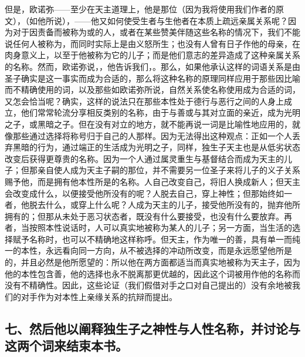 但是，欧诺弥——至少在天主道理上，他是那位（因为我将使用我们作者的原文），（如他所说），——他又如何使受生者与生他者在本质上疏远亲属关系呢？因为对于因责备而被称为或的人，或者在某些赞美伴随这些名称的情况下，我们不能说任何人被称为，而同时实际上是由义怒所生；也没有人曾有日子作他的母亲，在肉身意义上，以至于他被称为它的儿子；而是他们意志的差异造成了这种亲属关系的名称。然而，欧诺弥说，，他告诉我们，。那么，如果他承认这样的词语关系是由圣子确实是这一事实而成为合适的，那么将这种名称的原理同样应用于那些因比喻而不精确使用的词，以及那些如欧诺弥所说，自然关系使名称使用成为合适的词，又怎会恰当呢？确实，这样的说法只在那些本性处于德行与恶行之间的人身上成立，他们常常轮流分享相反类别的名称，由于与善或与其对立面的亲近，成为光明之子，或黑暗之子。但在没有对立的地方，就不能再说一词是比喻性地应用的，就像那些通过选择将称号归于自己的人那样。因为无法得出这种观点：正如一个人丢弃黑暗的行为，通过端正的生活成为光明之子，同样，独生子天主也是从低劣状态改变后获得更尊贵的名称。因为一个人通过属灵重生与基督结合而成为天主的儿子；但那亲自使人成为天主子嗣的那位，并不需要另一位圣子来将儿子的义子关系赐予他，而是拥有他本性所是的名称。人自己改变自己，将旧人换成新人；但天主会改变成什么，以便接受他所没有的呢？人脱去自己，穿上神性；但那始终如一者，他脱去什么，或穿上什么呢？人成为天主的儿子，接受他所没有的，抛弃他所拥有的；但那从未处于恶习状态者，既没有什么要接受，也没有什么要放弃。再者，当按照本性说话时，人可以真实地被称为某人的儿子；另一方面，当生活的选择赋予名称时，也可以不精确地这样称呼。但天主，作为唯一的善，具有单一而纯一的本性，永远看向同一方向，从不被选择的冲动所改变，而是永远愿望他所是的，并且必然是他所愿望的：所以他在两方面都适当而真实地被称为天主子，因为他的本性包含善，他的选择也永不脱离那更优越的，因此这个词被用作他的名称而没有不精确性。因此，这些论证（我们假借对手之口对自己提出的）没有余地被我们的对手作为对本性上亲缘关系的抗辩而提出。\par


\subsection{七、然后他以阐释独生子之神性与人性名称，并讨论与这两个词来结束本书。}

